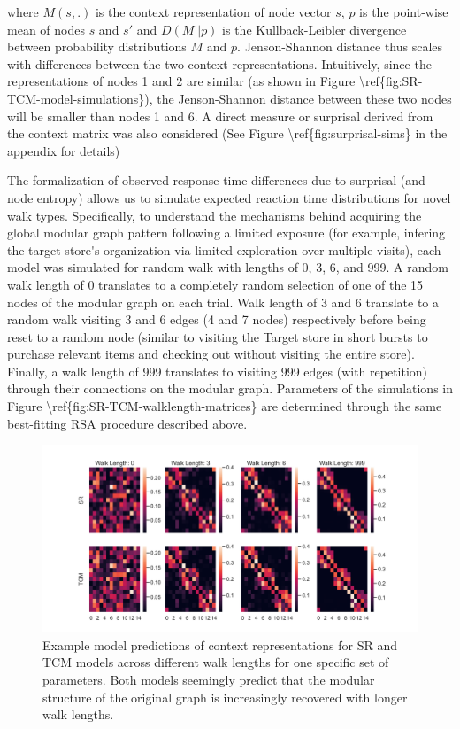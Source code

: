 where $M(s, .)$ is the context representation of node vector $s$, $p$ is the point-wise mean of nodes $s$ and $s'$ and $D(M||p)$ is the Kullback-Leibler divergence between probability distributions $M$ and $p$. \ac{Jenson-Shannon distance thus scales with differences between the two context representations. Intuitively, since the representations of nodes 1 and 2 are similar (as shown in Figure \ref{fig:SR-TCM-model-simulations}), the Jenson-Shannon distance between these two nodes will be smaller than nodes 1 and 6. A direct measure or surprisal derived from the context matrix was also considered (See Figure \ref{fig:surprisal-sims} in the appendix for details)}

The formalization of observed response time differences due to surprisal (and node entropy) allows us to simulate expected reaction time distributions for novel walk types. Specifically, to understand the mechanisms behind acquiring the global modular graph pattern following a limited exposure \ac{(for example, infering the target store's organization via limited exploration over multiple visits)}, each model was simulated for random walk with lengths of 0, 3, 6, and 999. A random walk length of 0 translates to a completely random selection of one of the 15 nodes of the modular graph on each trial. Walk length of 3 and 6 translate to a random walk visiting 3 and 6 edges (4 and 7 nodes) respectively before being reset to a random node (similar to visiting the Target store in short bursts to purchase relevant items and checking out without visiting the entire store). Finally, a walk length of 999 translates to visiting 999 edges (with repetition) through their connections on the modular graph. \ac{Parameters of the simulations in Figure \ref{fig:SR-TCM-walklength-matrices} are determined through the same best-fitting RSA procedure described above.} 

\begin{figure}
	\centering
	\includegraphics[width = \textwidth]{chapter_notebooks/chapter_2/figures/walk_length_SR_TCM_matrices.png}
	\caption{\ac{Example} model predictions of context representations for SR and TCM models across different walk lengths for \ac{one specific set of parameters}. Both models seemingly predict that the modular structure of the original graph is increasingly recovered with longer walk lengths.}
	\label{fig:SR-TCM-walklength-matrices}
\end{figure}


